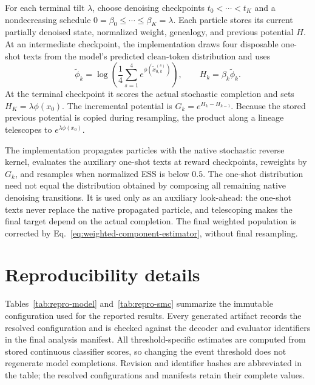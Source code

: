 \documentclass{article}
\begin{document}
For each terminal tilt $\lambda$, choose denoising checkpoints
$t_0<\cdots<t_K$ and a nondecreasing schedule
$0=\beta_0\leq\cdots\leq\beta_K=\lambda$. Each particle stores its current
partially denoised state, normalized weight, genealogy, and previous potential
$H$. At an intermediate checkpoint, the implementation draws four disposable
one-shot texts from the model's predicted clean-token distribution and
uses
\begin{equation}
\widetilde\phi_k
=\log\!\left(\frac{1}{4}\sum_{s=1}^{4}
e^{\phi(\widetilde x_{0,k}^{(s)})}\right),
\qquad
H_k=\beta_k\widetilde\phi_k.
\end{equation}
At the terminal checkpoint it scores the actual stochastic completion and sets
$H_K=\lambda\phi(x_0)$. The incremental potential is
$G_k=e^{H_k-H_{k-1}}$. Because the stored previous potential is copied during
resampling, the product along a lineage telescopes to
$e^{\lambda\phi(x_0)}$.

The implementation propagates particles with the native stochastic reverse
kernel, evaluates the auxiliary one-shot texts at reward checkpoints,
reweights by $G_k$, and resamples when normalized ESS is below $0.5$. The
one-shot distribution need not equal the distribution obtained by composing
all remaining native denoising transitions. It is used only as an auxiliary
look-ahead: the one-shot texts never replace the native propagated particle,
and telescoping makes the final target depend on the actual completion. The
final weighted population is corrected by
Eq.~\eqref{eq:weighted-component-estimator},
without final resampling.

\section{Reproducibility details}

Tables~\ref{tab:repro-model} and~\ref{tab:repro-smc} summarize the immutable
configuration used for the reported results. Every generated artifact records
the resolved configuration and is checked against the decoder and evaluator
identifiers in the final analysis manifest. All threshold-specific estimates
are computed from stored continuous classifier scores, so changing the event
threshold does not regenerate model completions. Revision and identifier hashes
are abbreviated in the table; the resolved configurations and manifests retain
their complete values.
\end{document}
